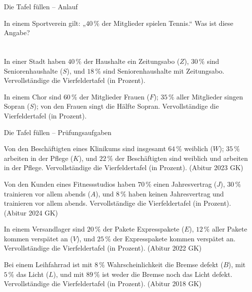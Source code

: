 \setcounter{aufgabe}{16}

\begin{aufgabe}{Die Tafel füllen – Anlauf}
\begin{teile}
\teil In einem Sportverein gilt: „$40\,\%$ der Mitglieder spielen Tennis.“ Was ist diese Angabe? \\  \\  \\ 
\teil In einer Stadt haben $40\,\%$ der Haushalte ein Zeitungsabo ($Z$), $30\,\%$ sind Seniorenhaushalte ($S$), und $18\,\%$ sind Seniorenhaushalte mit Zeitungsabo. Vervollständige die Vierfeldertafel (in Prozent).

\teil In einem Chor sind $60\,\%$ der Mitglieder Frauen ($F$); $35\,\%$ aller Mitglieder singen Sopran ($S$); von den Frauen singt die Hälfte Sopran. Vervollständige die Vierfeldertafel (in Prozent).

\end{teile}
\end{aufgabe}

\begin{aufgabe}{Die Tafel füllen – Prüfungsaufgaben}
\begin{teile}
\teil Von den Beschäftigten eines Klinikums sind insgesamt $64\,\%$ weiblich ($W$); $35\,\%$ arbeiten in der Pflege ($K$), und $22\,\%$ der Beschäftigten sind weiblich und arbeiten in der Pflege. Vervollständige die Vierfeldertafel (in Prozent). \hfill (Abitur 2023 GK)

\teil Von den Kunden eines Fitnessstudios haben $70\,\%$ einen Jahresvertrag ($J$), $30\,\%$ trainieren vor allem abends ($A$), und $8\,\%$ haben keinen Jahresvertrag und trainieren vor allem abends. Vervollständige die Vierfeldertafel (in Prozent). \hfill (Abitur 2024 GK)

\teil In einem Versandlager sind $20\,\%$ der Pakete Expresspakete ($E$), $12\,\%$ aller Pakete kommen verspätet an ($V$), und $25\,\%$ der Expresspakete kommen verspätet an. Vervollständige die Vierfeldertafel (in Prozent). \hfill (Abitur 2022 GK)

\teil Bei einem Leihfahrrad ist mit $8\,\%$ Wahrscheinlichkeit die Bremse defekt ($B$), mit $5\,\%$ das Licht ($L$), und mit $89\,\%$ ist weder die Bremse noch das Licht defekt. Vervollständige die Vierfeldertafel (in Prozent). \hfill (Abitur 2018 GK)

\end{teile}
\end{aufgabe}

